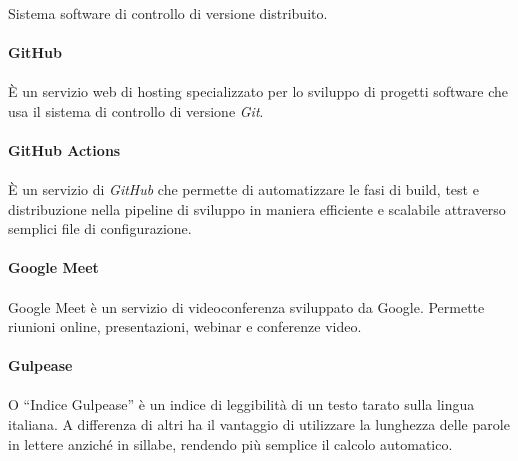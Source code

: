 \documentclass[10pt, a4paper]{article}
\begin{document}
\paragraph{}Sistema software di controllo di versione distribuito.

\vspace{2em}
\paragraph{GitHub}\noindent\hrulefill
\paragraph{}È un servizio web di hosting specializzato per lo sviluppo di progetti software 
che usa il sistema di controllo di versione \textit{Git\pg}.

\vspace{2em}
\paragraph{GitHub Actions}\noindent\hrulefill
\paragraph{}È un servizio di \textit{GitHub\pg} che permette di automatizzare le fasi di build, test e distribuzione nella pipeline di sviluppo in maniera efficiente e scalabile attraverso semplici file di configurazione.

\vspace{2em}
\paragraph{Google Meet}\noindent\hrulefill
\paragraph{}Google Meet è un servizio di videoconferenza sviluppato da Google. Permette riunioni online, presentazioni, webinar e conferenze video.

\vspace{2em}
\paragraph{Gulpease}\noindent\hrulefill 
\paragraph{}O “Indice Gulpease” è un indice di leggibilità di un testo tarato sulla
lingua italiana. A differenza di altri ha il vantaggio di utilizzare la lunghezza delle
parole in lettere anziché in sillabe, rendendo più semplice il calcolo automatico.
\end{document}
